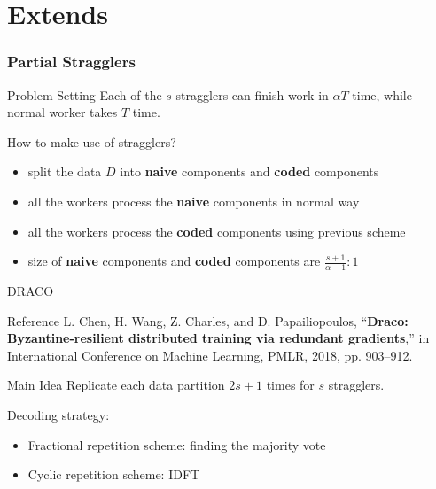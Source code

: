 \documentclass{beamer}
\begin{document}
\section{Extends}

\begin{frame}
    \frametitle{Partial Stragglers}

    \begin{block}{Problem Setting}
        Each of the $s$ stragglers can finish work in $\alpha T$ time, while normal worker takes $T$ time.

        How to make use of stragglers?
    \end{block}

    \begin{solution}
        
        \begin{itemize}
            \item split the data $D$ into \textbf{naive} components and \textbf{coded} components
            \item all the workers process the \textbf{naive} components in normal way
            \item all the workers process the \textbf{coded} components using previous scheme
            \item size of \textbf{naive} components and \textbf{coded} components are $\frac{s + 1}{\alpha - 1} : 1$
        \end{itemize}
    \end{solution}

\end{frame}

\begin{frame}{DRACO}
    \begin{block}{Reference}
        L. Chen, H. Wang, Z. Charles, and D. Papailiopoulos, “\textbf{Draco: Byzantine-resilient distributed training via redundant gradients},” in International Conference on Machine Learning, PMLR, 2018, pp. 903–912.
    \end{block}

    \begin{block}{Main Idea}
        Replicate each data partition $2s+1$ times for $s$ stragglers.

        Decoding strategy:
        \begin{itemize}
            \item Fractional repetition scheme: finding the majority vote
            \item Cyclic repetition scheme: IDFT
        \end{itemize}
    \end{block}

\end{frame}
\end{document}
